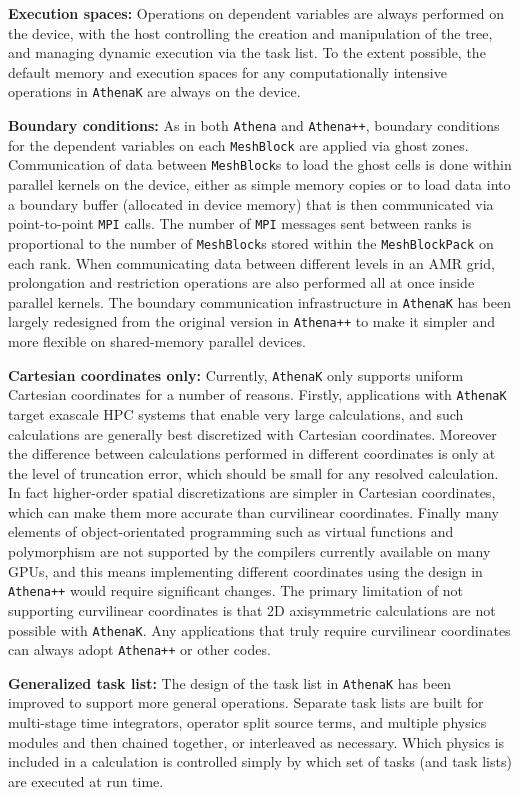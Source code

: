 \documentclass[twocolumn, floatfix]{aastex63}
\newcommand{\app}{\texttt{Athena++}}
\newcommand{\athena}{\texttt{Athena}}
\newcommand{\ak}{\texttt{AthenaK}}
\begin{document}
{\bf Execution spaces:} Operations on dependent variables are always performed on the device, with the host controlling the creation and manipulation of the tree, and managing dynamic execution via the task list. To the extent possible, the default memory and execution spaces for any computationally intensive operations in \ak{} are always on the device.

{\bf Boundary conditions:} As in both \athena{} and \app{}, boundary conditions for the dependent variables on each \texttt{MeshBlock} are applied via ghost zones. Communication of data between \texttt{MeshBlock}s to load the ghost cells is done within parallel kernels on the device, either as simple memory copies or to load data into a boundary buffer (allocated in device memory) that is then communicated via point-to-point \texttt{MPI} calls. The number of \texttt{MPI} messages sent between ranks is proportional to the number of \texttt{MeshBlock}s stored within the \texttt{MeshBlockPack} on each rank.  When communicating data between different levels in an AMR grid, prolongation and restriction operations are also performed all at once inside parallel kernels.  The boundary communication infrastructure in \ak{} has been largely redesigned from the original version in \app{} to make it simpler and more flexible on shared-memory parallel devices.

{\bf Cartesian coordinates only:} Currently, \ak{} only supports uniform Cartesian coordinates for a number of reasons.  Firstly, applications with \ak{} target exascale HPC systems that enable very large calculations, and such calculations are generally best discretized with Cartesian coordinates.  Moreover the difference between calculations performed in different coordinates is only at the level of truncation error, which should be small for any resolved calculation.  In fact higher-order spatial discretizations are simpler in Cartesian coordinates, which can make them more accurate than curvilinear coordinates. Finally many elements of object-orientated programming such as virtual functions and polymorphism are not supported by the compilers currently available on many GPUs, and this means implementing different coordinates using the design in \app{} would require significant changes. The primary limitation of not supporting curvilinear coordinates is that 2D axisymmetric calculations are not possible with \ak{}.  Any applications that truly require curvilinear coordinates can always adopt \app{} or other codes.

{\bf Generalized task list:} The design of the task list in \ak{} has been improved to support more general operations.  Separate task lists are built for multi-stage time integrators, operator split source terms, and multiple physics modules and then chained together, or interleaved as necessary. Which physics is included in a calculation is controlled simply by which set of tasks (and task lists) are executed at run time.
\end{document}
